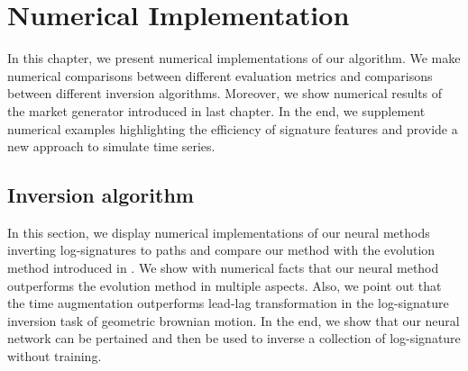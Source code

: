\documentclass[12pt]{report}
\theoremstyle{definition}
\theoremstyle{remark}
\begin{document}

\chapter{Numerical Implementation}\label{NumericalImplementation}
In this chapter, we present numerical implementations of our algorithm. We make numerical comparisons between different evaluation metrics and comparisons between different inversion algorithms. Moreover, we show numerical results of the market generator introduced in last chapter. In the end, we supplement numerical examples highlighting the efficiency of signature features and provide a new approach to simulate time series. 


\section{Inversion algorithm}
In this section, we display numerical implementations of our neural methods inverting log-signatures to paths and compare our method with the evolution method introduced in \cite{buehler2020data}. We show with numerical facts that our neural method outperforms the evolution method in multiple aspects. Also, we point out that the time augmentation outperforms lead-lag transformation in the log-signature inversion task of geometric brownian motion. In the end, we show that our neural network can be pertained and then be used to inverse a collection of log-signature without training.
\end{document}

